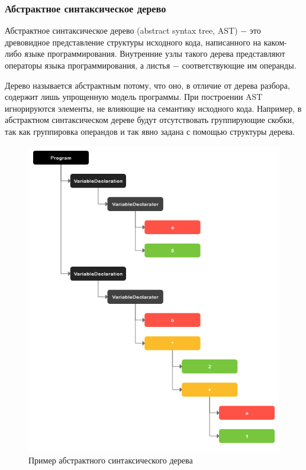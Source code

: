 \documentclass[14pt, a4paper]{article}
\begin{document}
\subsubsection{Абстрактное синтаксическое дерево}

Абстрактное синтаксическое дерево (abstract syntax tree, AST) $-$ это древовидное представление структуры исходного кода, написанного
на каком-либо языке программирования. Внутренние узлы такого дерева представляют операторы языка
программирования, а листья $-$ соответствующие им операнды.

Дерево называется абстрактным потому, что оно, в отличие от дерева разбора, содержит лишь упрощенную модель программы. При построении
AST игнорируются элементы, не влияющие на семантику исходного кода. Например, в абстрактном синтаксическом
дереве будут отсутствовать группирующие скобки, так как группировка операндов и так явно задана с помощью структуры дерева.

\begin{figure}[H]
  \centering
  \includegraphics[scale=0.6]{img/ast.png}
  \caption{Пример абстрактного синтаксического дерева}
  \label{ast}
\end{figure}
\end{document}
